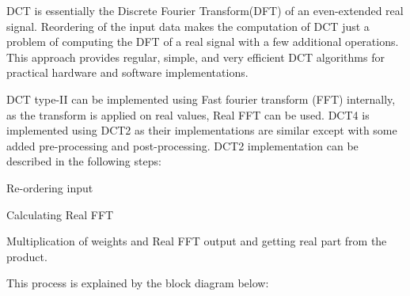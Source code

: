 D\-C\-T is essentially the Discrete Fourier Transform(\-D\-F\-T) of an even-\/extended real signal. Reordering of the input data makes the computation of D\-C\-T just a problem of computing the D\-F\-T of a real signal with a few additional operations. This approach provides regular, simple, and very efficient D\-C\-T algorithms for practical hardware and software implementations.

D\-C\-T type-\/\-I\-I can be implemented using Fast fourier transform (F\-F\-T) internally, as the transform is applied on real values, Real F\-F\-T can be used. D\-C\-T4 is implemented using D\-C\-T2 as their implementations are similar except with some added pre-\/processing and post-\/processing. D\-C\-T2 implementation can be described in the following steps\-:
\begin{DoxyItemize}
\item Re-\/ordering input
\item Calculating Real F\-F\-T
\item Multiplication of weights and Real F\-F\-T output and getting real part from the product.
\end{DoxyItemize}

This process is explained by the block diagram below\-: 

